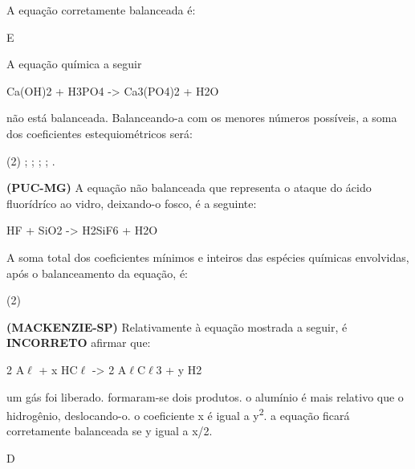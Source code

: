 \documentclass[9 pt]{scrartcl}
\def\PQ{0.84} %
\begin{document}
\begin{exercise}[points=\PQ]
A equação corretamente balanceada é:
\begin{choice}
\choice  {}

\choice {}

\choice {}

\choice {}

\choice {}
\end{choice}
\end{exercise}
\begin{solution}
E
\end{solution}



\begin{exercise}[points=\PQ]
A equação química a seguir
\begin{reaction*}
Ca(OH)2 + H3PO4 -> Ca3(PO4)2 + H2O
\end{reaction*}

não está balanceada. Balanceando-a com os menores números possíveis, a soma dos coeficientes estequiométricos será:
\begin{choice}(2)
;
;
;
;
.
\end{choice}
\end{exercise}



\begin{exercise}[points=\PQ]
\textbf{(PUC-MG)} A equação não balanceada que representa o ataque do ácido fluorídríco ao vidro,
deixando-o fosco, é a seguinte:
\begin{reaction*}
HF + SiO2 -> H2SiF6 + H2O
\end{reaction*}

A soma total dos coeficientes mínimos e inteiros das espécies químicas envolvidas, após o
balanceamento da equação, é:

\begin{choice}(2)
\end{choice}
\end{exercise}


\begin{exercise}[points=\PQ]
\textbf{(MACKENZIE-SP)} Relativamente à equação mostrada a seguir, é \textbf{INCORRETO} afirmar que:
\begin{reaction*}
2 A$\ell$\sld{} + x HC$\ell$\aq{} ->  2 A$\ell$C$\ell$3\sld{} + y H2\gas{}
\end{reaction*}

\begin{choice}
\choice um gás foi liberado.
\choice formaram-se dois produtos.
\choice o alumínio é mais relativo que o hidrogênio, deslocando-o.
\choice o coeficiente x é igual a y\textsuperscript{2}.
\choice a equação ficará corretamente balanceada se y igual a x/2.
\end{choice}
\end{exercise}
\begin{solution}
D
\end{solution}
\end{document}
